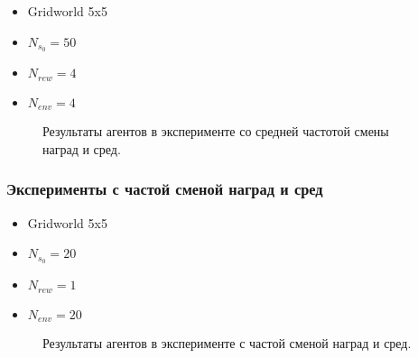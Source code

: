 \documentclass[a4paper]{article}
\begin{document}
\begin{itemize}
  \item Gridworld 5x5
  \item $N_{s_0} = 50$
  \item $N_{rew} = 4$
  \item $N_{env} = 4$
\end{itemize}

\begin{figure}
  \centering
  \begin{minipage}{.32\linewidth}
    
    
  \end{minipage}
  \begin{minipage}{.32\linewidth}
    
    
  \end{minipage}
  \begin{minipage}{.32\linewidth}
    
    
  \end{minipage}
  \caption{Результаты агентов в эксперименте со средней частотой смены наград и сред.}
\end{figure}

\subsubsection{Эксперименты с частой сменой наград и сред}

\begin{itemize}
  \item Gridworld 5x5
  \item $N_{s_0} = 20$
  \item $N_{rew} = 1$
  \item $N_{env} = 20$
\end{itemize}

\begin{figure}
  \centering
  \begin{minipage}{.32\linewidth}
    
  \end{minipage}
  \begin{minipage}{.32\linewidth}
    
  \end{minipage}
  \begin{minipage}{.32\linewidth}
    
  \end{minipage}
  \caption{Результаты агентов в эксперименте с частой сменой наград и сред.}
\end{figure}
\end{document}
